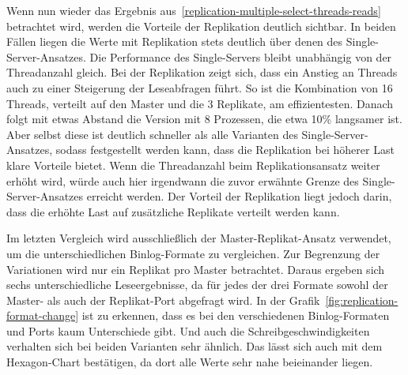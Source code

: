 Wenn nun wieder das Ergebnis aus~\ref{replication-multiple-select-threads-reads} betrachtet wird, werden die Vorteile der Replikation deutlich sichtbar.
In beiden Fällen liegen die Werte mit Replikation stets deutlich über denen des Single-Server-Ansatzes.
Die Performance des Single-Servers bleibt unabhängig von der Threadanzahl gleich.
Bei der Replikation zeigt sich, dass ein Anstieg an Threads auch zu einer Steigerung der Leseabfragen führt.
So ist die Kombination von 16 Threads, verteilt auf den Master und die 3 Replikate, am effizientesten.
Danach folgt mit etwas Abstand die Version mit 8 Prozessen, die etwa 10\% langsamer ist.
Aber selbst diese ist deutlich schneller als alle Varianten des Single-Server-Ansatzes, sodass festgestellt werden kann, dass die Replikation bei höherer Last klare Vorteile bietet.
Wenn die Threadanzahl beim Replikationsansatz weiter erhöht wird, würde auch hier irgendwann die zuvor erwähnte Grenze des Single-Server-Ansatzes erreicht werden.
Der Vorteil der Replikation liegt jedoch darin, dass die erhöhte Last auf zusätzliche Replikate verteilt werden kann.

Im letzten Vergleich wird ausschließlich der Master-Replikat-Ansatz verwendet, um die unterschiedlichen Binlog-Formate zu vergleichen.
Zur Begrenzung der Variationen wird nur ein Replikat pro Master betrachtet.
Daraus ergeben sich sechs unterschiedliche Leseergebnisse, da für jedes der drei Formate sowohl der Master- als auch der Replikat-Port abgefragt wird.
In der Grafik~\ref{fig:replication-format-change} ist zu erkennen, dass es bei den verschiedenen Binlog-Formaten und Ports kaum Unterschiede gibt.
Und auch die Schreibgeschwindigkeiten verhalten sich bei beiden Varianten sehr ähnlich.
Das lässt sich auch mit dem Hexagon-Chart bestätigen, da dort alle Werte sehr nahe beieinander liegen.

